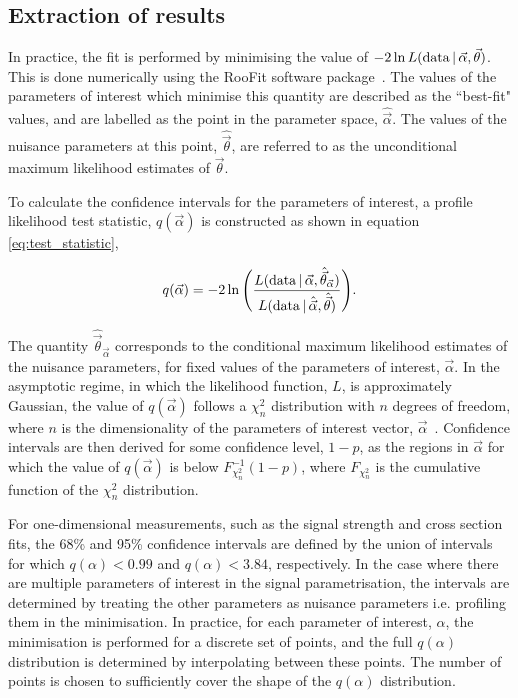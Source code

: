 \subsection{Extraction of results}\label{sec:results_extraction}

In practice, the fit is performed by minimising the value of $-2 \ln L({\rm{data}}\,|\,\vec{\alpha},\vec{\theta})$. This is done numerically using the RooFit software package~\cite{Verkerke:2003ir}. The values of the parameters of interest which minimise this quantity are described as the ``best-fit" values, and are labelled as the point in the parameter space, $\hat{\vec{\alpha}}$. The values of the nuisance parameters at this point, $\hat{\vec{\theta}}$, are referred to as the unconditional maximum likelihood estimates of $\vec{\theta}$. 

To calculate the confidence intervals for the parameters of interest, a profile likelihood test statistic, $q(\vec{\alpha})$ is constructed as shown in equation \ref{eq:test_statistic},

\begin{equation}\label{eq:test_statistic}
    q(\vec{\alpha}) = -2 \ln \Bigg( \frac{L({\rm{data}}\,|\,\vec{\alpha},\hat{\vec{\theta}}_{\vec{\alpha}})}{L({\rm{data}}\,|\,\hat{\vec{\alpha}},\hat{\vec{\theta}})} \Bigg).
\end{equation}

\noindent
The quantity $\hat{\vec{\theta}}_{\vec{\alpha}}$ corresponds to the conditional maximum likelihood estimates of the nuisance parameters, for fixed values of the parameters of interest, $\vec{\alpha}$. In the asymptotic regime, in which the likelihood function, $L$, is approximately Gaussian, the value of $q(\vec{\alpha})$ follows a $\chi_n^2$ distribution with $n$ degrees of freedom, where $n$ is the dimensionality of the parameters of interest vector, $\vec{\alpha}$~\cite{Cowan:2010js}. Confidence intervals are then derived for some confidence level, $1-p$, as the regions in $\vec{\alpha}$ for which the value of $q(\vec{\alpha})$ is below $F^{-1}_{\chi^2_n}(1-p)$, where $F_{\chi^2_n}$ is the cumulative function of the $\chi^2_n$ distribution.

For one-dimensional measurements, such as the signal strength and cross section fits, the 68\% and 95\% confidence intervals are defined by the union of intervals for which $q(\alpha)<0.99$ and $q(\alpha)<3.84$, respectively. In the case where there are multiple parameters of interest in the signal parametrisation, the intervals are determined by treating the other parameters as nuisance parameters i.e. profiling them in the minimisation. In practice, for each parameter of interest, $\alpha$, the minimisation is performed for a discrete set of points, and the full $q(\alpha)$ distribution is determined by interpolating between these points. The number of points is chosen to sufficiently cover the shape of the $q(\alpha)$ distribution.

